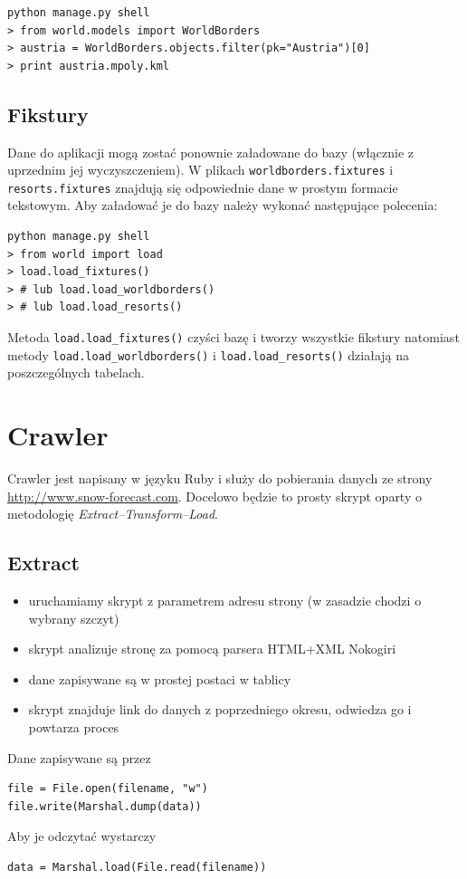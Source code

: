 \documentclass[12pt]{article}
\begin{document}
\begin{verbatim}
python manage.py shell
> from world.models import WorldBorders
> austria = WorldBorders.objects.filter(pk="Austria")[0]
> print austria.mpoly.kml
\end{verbatim}

\subsection{Fikstury}
Dane do aplikacji mogą zostać ponownie załadowane do bazy (włącznie z uprzednim jej wyczyszczeniem). W plikach
\texttt{worldborders.fixtures} i \texttt{resorts.fixtures} znajdują się odpowiednie dane w prostym formacie tekstowym.
Aby załadować je do bazy należy wykonać następujące polecenia:
\begin{verbatim}
python manage.py shell
> from world import load
> load.load_fixtures()
> # lub load.load_worldborders()
> # lub load.load_resorts()
\end{verbatim}
Metoda \texttt{load.load\_fixtures()} czyści bazę i tworzy wszystkie fikstury natomiast metody \texttt{load.load\_worldborders()}
i \texttt{load.load\_resorts()} działają na poszczególnych tabelach.

\section{Crawler}
Crawler jest napisany w języku Ruby i służy do pobierania danych ze strony
\\\url{http://www.snow-forecast.com}.
Docelowo będzie to prosty skrypt oparty o metodologię \emph{Extract--Transform--Load}.
\subsection{Extract}
\begin{itemize}
\item uruchamiamy skrypt z parametrem adresu strony (w zasadzie chodzi o wybrany szczyt)
\item skrypt analizuje stronę za pomocą parsera HTML+XML Nokogiri
\item dane zapisywane są w prostej postaci w tablicy
\item skrypt znajduje link do danych z poprzedniego okresu, odwiedza go i powtarza proces
\end{itemize}
Dane zapisywane są przez
\begin{verbatim}
file = File.open(filename, "w")
file.write(Marshal.dump(data))
\end{verbatim}
Aby je odczytać wystarczy
\begin{verbatim}
data = Marshal.load(File.read(filename))
\end{verbatim}
\end{document}
